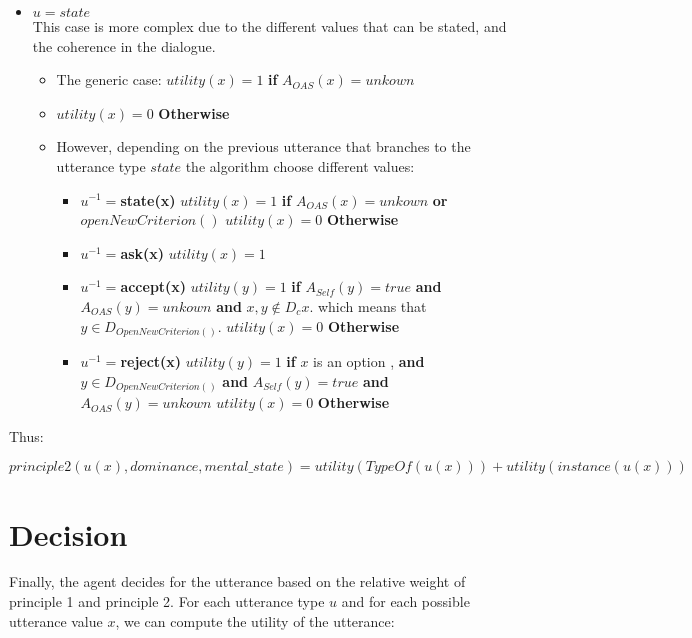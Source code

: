 \documentclass{article}
\begin{document}
\begin{itemize}
	\item $ u= state$
	\\ This case is more complex due to the different values that can be stated, and the coherence in the dialogue. 
	\begin{itemize}
		\item The generic case: $utility (x)=1$ \textbf{ if } $A_{OAS}(x)= unkown$ 
		\item $utility (x)=0$ \textbf{Otherwise}	
		\item However, depending on the previous utterance that branches to the utterance type $state$ the algorithm choose different values:
			\begin{itemize}
				\item $u^{-1} =$\textbf{state(x)}
					\subitem $utility (x)=1$ \textbf{ if } $A_{OAS}(x)= unkown$  \textbf{ or } $openNewCriterion()$
					\subitem $utility (x)=0$ \textbf{Otherwise}	
				\item $u^{-1} =$\textbf{ask(x)}
					\subitem $utility (x)=1$ 
				\item $u^{-1} =$\textbf{accept(x)}
					\subitem $utility (y)=1$  \textbf{ if }	$A_{Self} (y) = true$ \textbf{ and } $A_{OAS}(y)= unkown$  \textbf{and}  $x, y \notin D_cx.$ which means that $y \in D_{OpenNewCriterion()}.$
					\subitem 	$utility (x)=0$ \textbf{Otherwise}
					
				\item $u^{-1} =$\textbf{reject(x)}
				\subitem $utility (y)=1$  \textbf{ if }	$x$ is an option , \textbf{ and } $ y \in D_{OpenNewCriterion()}$ \textbf{ and } $A_{Self} (y) = true$ \textbf{ and } $A_{OAS}(y)= unkown$
				\subitem 	$utility (x)=0$ \textbf{Otherwise}		
					
			\end{itemize}

	\end{itemize}
	
\end{itemize}
Thus:

$$principle2(u(x),dominance,mental\_state) = utility(TypeOf(u(x))) + utility(instance(u(x)))$$
\section{Decision}

Finally, the agent decides for the utterance based on the relative weight of principle 1 and principle 2. For each utterance type $u$ and for each possible utterance value $x$, we can compute the utility of the utterance:
\end{document}
